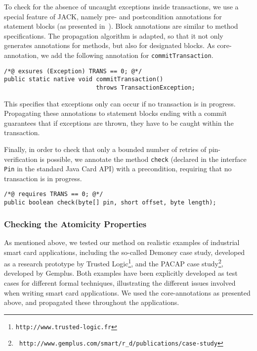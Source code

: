 To check for the absence of uncaught exceptions inside transactions,
we use a special feature of JACK, namely pre- and postcondition
annotations for statement blocks (as presented
in~\cite{BurdyRL03}). Block annotations are  similar to method
specifications. The propagation algorithm is adapted, so that it not
only generates annotations for methods, but also for designated
blocks. As core-annotation, we add the following annotation for
\texttt{commitTransaction}. 
\begin{verbatim}
/*@ exsures (Exception) TRANS == 0; @*/
public static native void commitTransaction() 
                          throws TransactionException;
\end{verbatim}
This specifies that exceptions only can occur if no transaction is in
progress. Propagating these annotations to statement blocks ending
with a commit guarantees that if exceptions are thrown, they have to
be caught within the transaction.



Finally, in order to check that only a bounded number of retries of
pin-verification is possible, we annotate the method \texttt{check}
(declared in the interface \texttt{Pin} in the
standard Java Card API) with a precondition, requiring that no
transaction is in progress.
\begin{verbatim}
/*@ requires TRANS == 0; @*/
public boolean check(byte[] pin, short offset, byte length);
\end{verbatim}

\subsubsection{Checking the Atomicity Properties}


As mentioned above, we tested our method on realistic examples of
industrial smart card applications, including the so-called Demoney
case study, developed as a research prototype by Trusted
Logic\footnote{{\tt http://www.trusted-logic.fr}}, and the PACAP case
study\footnote{{\tt
http://www.gemplus.com/smart/r\_d/publications/case-study}}, developed
by Gemplus. Both examples have been explicitly developed as test cases
for different formal techniques, illustrating the different issues
involved when writing smart card applications. We used the
core-annotations as presented above, and propagated these throughout
the applications.

